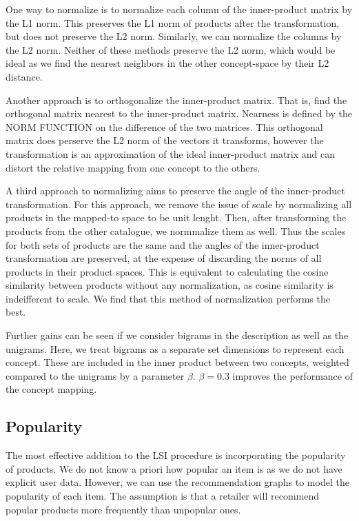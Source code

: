 \documentclass[11pt]{article}
\begin{document}
One way to normalize is to normalize each column of the inner-product matrix by
the L1 norm. This preserves the L1 norm of products after the transformation,
but does not preserve the L2 norm. Similarly, we can normalize the columns by
the L2 norm. Neither of these methods preserve the L2 norm, which would be ideal
as we find the nearest neighbors in the other concept-space by their L2
distance.

Another approach is to orthogonalize the inner-product matrix. That is, find the
orthogonal matrix nearest to the inner-product matrix. Nearness is defined by
the NORM FUNCTION on the difference of the two matrices. This orthogonal matrix
does perserve the L2 norm of the vectors it transforms, however the
transformation is an approximation of the ideal inner-product matrix and can
distort the relative mapping from one concept to the others.

A third approach to normalizing aims to preserve the angle of the inner-product
transformation. For this approach, we remove the issue of scale by normalizing
all products in the mapped-to space to be unit lenght. Then, after transforming
the products from the other catalogue, we normmalize them as well. Thus the
scales for both sets of products are the same and the angles of the
inner-product transformation are preserved, at the expense of discarding the
norms of all products in their product spaces. This is equivalent to calculating
the cosine similarity between products without any normalization, as cosine
similarity is indeifferent to scale. We find that this method of normalization
performs the best.

Further gains can be seen if we consider bigrams in the description as well as
the unigrams. Here, we treat bigrams as a separate set dimensions to represent
each concept. These are included in the inner product between two concepts,
weighted compared to the unigrams by a parameter $\beta$. $\beta = 0.3$ improves the
performance of the concept mapping.

\subsection*{Popularity}
The most effective addition to the LSI procedure is incorporating the popularity
of products. We do not know a priori how popular an item is as we do not have
explicit user data. However, we can use the recommendation graphs to model the
popularity of each item. The assumption is that a retailer will recommend
popular products more frequently than unpopular ones.
\end{document}
